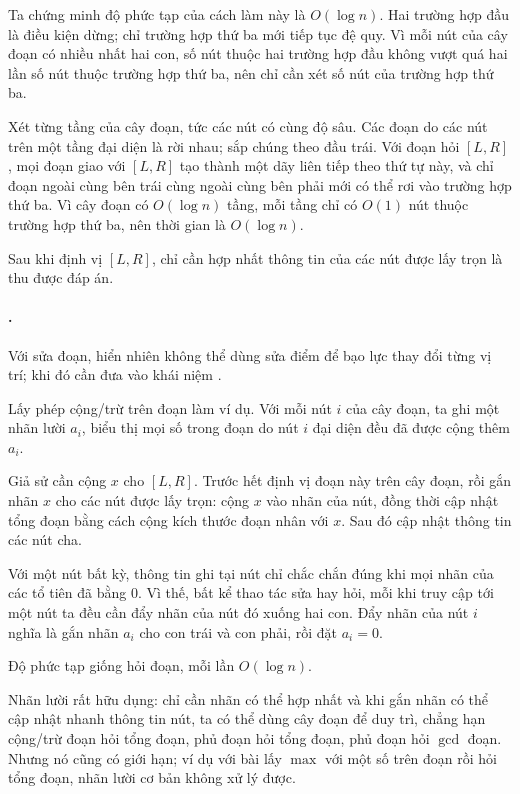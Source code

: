 \documentclass[11pt]{article}
\begin{document}
Ta chứng minh độ phức tạp của cách làm này là \(O(\log n)\). Hai trường hợp
đầu là điều kiện dừng; chỉ trường hợp thứ ba mới tiếp tục đệ quy. Vì mỗi nút
của cây đoạn có nhiều nhất hai con, số nút thuộc hai trường hợp đầu không
vượt quá hai lần số nút thuộc trường hợp thứ ba, nên chỉ cần xét số nút của
trường hợp thứ ba.

Xét từng tầng của cây đoạn, tức các nút có cùng độ sâu. Các đoạn do các nút
trên một tầng đại diện là rời nhau; sắp chúng theo đầu trái. Với đoạn hỏi
\([L,R]\), mọi đoạn giao với \([L,R]\) tạo thành một dãy liên tiếp theo thứ
tự này, và chỉ đoạn ngoài cùng bên trái cùng ngoài cùng bên phải mới có thể
rơi vào trường hợp thứ ba. Vì cây đoạn có \(O(\log n)\) tầng, mỗi tầng chỉ có
\(O(1)\) nút thuộc trường hợp thứ ba, nên thời gian là \(O(\log n)\).

Sau khi định vị \([L,R]\), chỉ cần hợp nhất thông tin của các nút được lấy
trọn là thu được đáp án.

\paragraph{.}
Với sửa đoạn, hiển nhiên không thể dùng sửa điểm để bạo lực thay đổi từng vị
trí; khi đó cần đưa vào khái niệm .

Lấy phép cộng/trừ trên đoạn làm ví dụ. Với mỗi nút \(i\) của cây đoạn, ta ghi
một nhãn lười \(a_i\), biểu thị mọi số trong đoạn do nút \(i\) đại diện đều
đã được cộng thêm \(a_i\).

Giả sử cần cộng \(x\) cho \([L,R]\). Trước hết định vị đoạn này trên cây
đoạn, rồi gắn nhãn \(x\) cho các nút được lấy trọn: cộng \(x\) vào nhãn của
nút, đồng thời cập nhật tổng đoạn bằng cách cộng kích thước đoạn nhân với
\(x\). Sau đó cập nhật thông tin các nút cha.

Với một nút bất kỳ, thông tin ghi tại nút chỉ chắc chắn đúng khi mọi nhãn của
các tổ tiên đã bằng \(0\). Vì thế, bất kể thao tác sửa hay hỏi, mỗi khi truy
cập tới một nút ta đều cần đẩy nhãn của nút đó xuống hai con. Đẩy nhãn của
nút \(i\) nghĩa là gắn nhãn \(a_i\) cho con trái và con phải, rồi đặt
\(a_i=0\).

Độ phức tạp giống hỏi đoạn, mỗi lần \(O(\log n)\).

Nhãn lười rất hữu dụng: chỉ cần nhãn có thể hợp nhất và khi gắn nhãn có thể
cập nhật nhanh thông tin nút, ta có thể dùng cây đoạn để duy trì, chẳng hạn
cộng/trừ đoạn hỏi tổng đoạn, phủ đoạn hỏi tổng đoạn, phủ đoạn hỏi \(\gcd\)
đoạn. Nhưng nó cũng có giới hạn; ví dụ với bài lấy \(\max\) với một số trên
đoạn rồi hỏi tổng đoạn, nhãn lười cơ bản không xử lý được.
\end{document}
